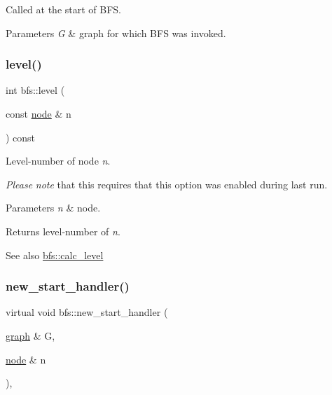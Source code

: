 Called at the start of B\+FS. 


\begin{DoxyParams}{Parameters}
{\em G} & graph for which B\+FS was invoked. \\
\hline
\end{DoxyParams}
\mbox{\label{classbfs_ac0158a0453fb17a89be4049d21db56b1}} 
\subsubsection{\texorpdfstring{level()}{level()}}
{\footnotesize\ttfamily int bfs\+::level (\begin{DoxyParamCaption}\item[{const \mbox{\hyperlink{classnode}{node}} \&}]{n }\end{DoxyParamCaption}) const\hspace{0.3cm}{\ttfamily [inline]}}



Level-\/number of node {\itshape n}. 

{\itshape Please} {\itshape note} that this requires that this option was enabled during last run.


\begin{DoxyParams}{Parameters}
{\em n} & node. \\
\hline
\end{DoxyParams}
\begin{DoxyReturn}{Returns}
level-\/number of {\itshape n}. 
\end{DoxyReturn}
\begin{DoxySeeAlso}{See also}
\mbox{\hyperlink{classbfs_a491515da4eb8efca0be4fef0df350a8e}{bfs\+::calc\+\_\+level}} 
\end{DoxySeeAlso}
\mbox{\label{classbfs_a4f33f10121240390a5a50b5efc16c1f5}} 
\subsubsection{\texorpdfstring{new\+\_\+start\+\_\+handler()}{new\_start\_handler()}}
{\footnotesize\ttfamily virtual void bfs\+::new\+\_\+start\+\_\+handler (\begin{DoxyParamCaption}\item[{\mbox{\hyperlink{classgraph}{graph}} \&}]{G,  }\item[{\mbox{\hyperlink{classnode}{node}} \&}]{n }\end{DoxyParamCaption})\hspace{0.3cm}{\ttfamily [inline]}, {\ttfamily [virtual]}}



